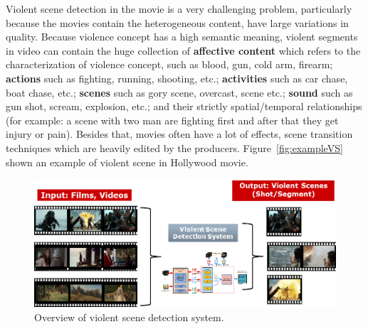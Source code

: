 \documentclass[review]{elsarticle}
\begin{document}
Violent scene detection in the movie is a very challenging problem, particularly because the movies contain the heterogeneous content, have large variations in quality. Because violence concept has a high semantic meaning, violent segments in video can contain the huge collection of {\bf affective content} which refers to the characterization of violence concept, such as blood,  gun, cold arm, firearm;  {\bf actions} such as fighting, running, shooting, etc.; {\bf activities} such as car chase, boat chase, etc.; {\bf scenes} such as gory scene, overcast, scene etc.; {\bf sound} such as gun shot, scream, explosion, etc.; and their strictly spatial/temporal relationships (for example: a scene with two man are fighting first and after that they get injury or pain). Besides that, movies often have a lot of effects, scene transition techniques which are heavily edited by the producers.  Figure~\ref{fig:exampleVS}\, shown an example of violent scene in Hollywood movie.
\begin{figure}[!b]
	\centering
	\includegraphics[width=1\linewidth]{Images/SystemOverview.png}
	\caption{Overview of violent scene detection system.}
	\label{fig:systemoverview}
\end{figure}
\end{document}
